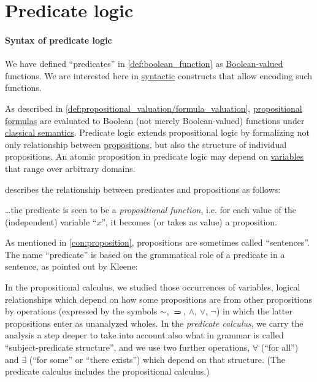\section{Predicate logic}\label{sec:predicate_logic}

\paragraph{Syntax of predicate logic}

\begin{remark}\label{rem:predicate_logic}
  We have defined \enquote{predicates} in \cref{def:boolean_function} as \hyperref[con:boolean_value]{Boolean-valued} functions. We are interested here in \hyperref[con:syntax_semantics_duality]{syntactic} constructs that allow encoding such functions.

  As described in \cref{def:propositional_valuation/formula_valuation}, \hyperref[def:propositional_syntax/formula]{propositional formulas} are evaluated to Boolean (not merely Boolean-valued) functions under \hyperref[def:first_order_semantics]{classical semantics}. Predicate logic extends propositional logic by formalizing not only relationship between \hyperref[con:proposition]{propositions}, but also the structure of individual propositions. An atomic proposition in predicate logic may depend on \hyperref[con:variable]{variables} that range over arbitrary domains.

   describes the relationship between predicates and propositions as follows:
  \begin{displayquote}
    \ldots the predicate is seen to be a \textit{propositional function}, i.e. for each value of the (independent) variable \enquote{\( x \)}, it becomes (or takes as value) a proposition.
  \end{displayquote}

  As mentioned in \cref{con:proposition}, propositions are sometimes called \enquote{sentences}. The name \enquote{predicate} is based on the grammatical role of a predicate in a sentence, as pointed out by Kleene:
  \begin{displayquote}
    In the propositional calculus, we studied those occurrences of variables, logical relationships which depend on how some propositions are from other propositions by operations (expressed by the symbols \( \sim \), \( \rightimply \), \( \land \), \( \vee \), \( \neg \)) in which the latter
    propositions enter as unanalyzed wholes. In the \textit{predicate calculus}, we carry the analysis a step deeper to take into account also what in grammar is called \enquote{subject-predicate structure}, and we use two further operations, \( \forall \) (\enquote{for all}) and \( \exists \) (\enquote{for some} or \enquote{there exists}) which depend on that structure. (The predicate calculus includes the propositional calculus.)
  \end{displayquote}


\end{remark}
